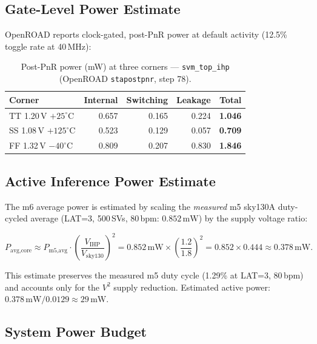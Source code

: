 \documentclass[11pt]{article}
\newcommand{\mW}{\,\mathrm{mW}}
\begin{document}
\subsection{Gate-Level Power Estimate}

OpenROAD reports clock-gated, post-PnR power at default activity (12.5\% toggle
rate at 40\,MHz):

\begin{table}[H]
  \centering
  \caption{Post-PnR power (mW) at three corners --- \texttt{svm\_top\_ihp}
           (OpenROAD \texttt{stapostpnr}, step 78).}
  \label{tab:power}
  \small
  \begin{tabular}{lrrrr}
    \toprule
    Corner & Internal & Switching & Leakage & \textbf{Total} \\
    \midrule
    TT 1.20\,V $+25^\circ$C   & 0.657 & 0.165 & 0.224 & \textbf{1.046} \\
    SS 1.08\,V $+125^\circ$C  & 0.523 & 0.129 & 0.057 & \textbf{0.709} \\
    FF 1.32\,V $-40^\circ$C   & 0.809 & 0.207 & 0.830 & \textbf{1.846} \\
    \bottomrule
  \end{tabular}
\end{table}

\subsection{Active Inference Power Estimate}

The m6 average power is estimated by scaling the \emph{measured} m5 sky130A
duty-cycled average (LAT=3, 500\,SVs, 80\,bpm: $0.852\,\mathrm{mW}$)
by the supply voltage ratio:

\begin{equation}
  P_{\text{avg,core}} \approx P_{\text{m5,avg}}\cdot\left(\frac{V_{\text{IHP}}}{V_{\text{sky130}}}\right)^2
  = 0.852\mW \times \left(\frac{1.2}{1.8}\right)^2
  = 0.852 \times 0.444 \approx 0.378\mW.
  \label{eq:power_scale}
\end{equation}

\noindent This estimate preserves the measured m5 duty cycle (1.29\% at
LAT=3, 80\,bpm) and accounts only for the $V^2$ supply reduction.
Estimated active power: $0.378\,\mathrm{mW} / 0.0129 \approx 29\,\mathrm{mW}$.

\subsection{System Power Budget}
\end{document}
